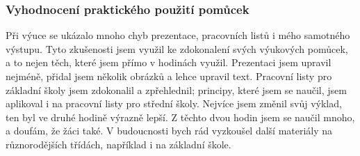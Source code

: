\subsubsection{Vyhodnocení praktického použití pomůcek}
{Při výuce se ukázalo mnoho chyb prezentace, pracovních listů i mého samotného výstupu. Tyto zkušenosti jsem využil ke zdokonalení svých výukových pomůcek, a to nejen těch, které jsem přímo v hodinách využil.}\odst
{Prezentaci jsem upravil nejméně, přidal jsem několik obrázků a lehce upravil text. Pracovní listy pro základní školy jsem zdokonalil a zpřehlednil; principy, které jsem se naučil, jsem aplikoval i na pracovní listy pro střední školy. Nejvíce jsem změnil svůj výklad, ten byl ve druhé hodině výrazně lepší.}\odst
{Z těchto dvou hodin jsem se naučil mnoho, a doufám, že žáci také. V budoucnosti bych rád vyzkoušel další materiály na různorodějších třídách, například i na základní škole.}
\newpage
